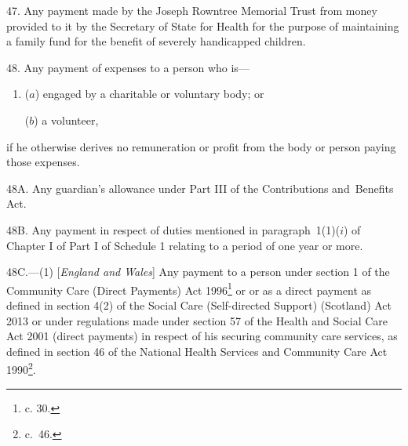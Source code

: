 \documentclass[12pt,a4paper]{article}
\begin{document}
\medskip

47.  Any payment made by the Joseph Rowntree Memorial Trust from money provided to it by the Secretary of State for Health for the purpose of maintaining a family fund for the benefit of severely handicapped children.

\medskip

48.  Any payment of expenses to a person who is—
\begin{enumerate}\item[]
($a$) engaged by a charitable or voluntary body; or

($b$) a volunteer,
\end{enumerate}
if he otherwise derives no remuneration or profit from the body or person paying those expenses.

\medskip


48A.  Any guardian’s allowance under Part III of the Contributions and~Benefits Act. 


\medskip

48B. Any payment in respect of duties mentioned in paragraph~1(1)($i$) of Chapter I of Part I of Schedule 1 relating to a period of one year or more.


\medskip

48C.---(1)  [\emph{England and Wales}] Any payment to a person under section 1 of the Community Care (Direct Payments) Act 1996\footnote{ c. 30.} or
or as a direct payment as defined in section 4(2) of the Social Care (Self-directed Support) (Scotland) Act 2013 %
or under regulations made under section 57 of the Health and Social Care Act 2001 (direct payments)  %
in respect of his securing community care services, as defined in section 46 of the National Health Services and Community Care Act 1990\footnote{ c.~46.}.
\end{document}
